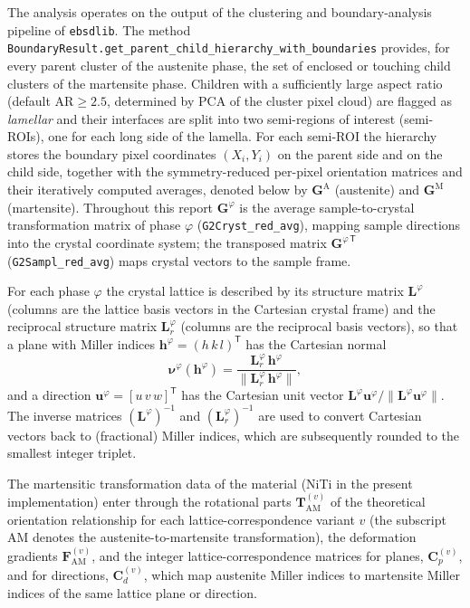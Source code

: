 \documentclass[11pt,a4paper]{article}
\newcommand{\mat}[1]{\mathbf{#1}}
\newcommand{\vc}[1]{\bm{#1}}
\begin{document}
The analysis operates on the output of the clustering and boundary-analysis pipeline of \texttt{ebsdlib}. The method \texttt{BoundaryResult.get\_parent\_child\_hierarchy\_with\_boundaries} provides, for every parent cluster of the austenite phase, the set of enclosed or touching child clusters of the martensite phase. Children with a sufficiently large aspect ratio (default $\mathrm{AR}\geq 2.5$, determined by PCA of the cluster pixel cloud) are flagged as \emph{lamellar} and their interfaces are split into two semi-regions of interest (semi-ROIs), one for each long side of the lamella. For each semi-ROI the hierarchy stores the boundary pixel coordinates $(X_i,Y_i)$ on the parent side and on the child side, together with the symmetry-reduced per-pixel orientation matrices and their iteratively computed averages, denoted below by $\mat{G}^{\mathrm{A}}$ (austenite) and $\mat{G}^{\mathrm{M}}$ (martensite). Throughout this report $\mat{G}^{\varphi}$ is the average sample-to-crystal transformation matrix of phase $\varphi$ (\texttt{G2Cryst\_red\_avg}), mapping sample directions into the crystal coordinate system; the transposed matrix $\mat{G}^{\varphi\,\mathsf{T}}$ (\texttt{G2Sampl\_red\_avg}) maps crystal vectors to the sample frame.

For each phase $\varphi$ the crystal lattice is described by its structure matrix $\mat{L}^{\varphi}$ (columns are the lattice basis vectors in the Cartesian crystal frame) and the reciprocal structure matrix $\mat{L}_{r}^{\varphi}$ (columns are the reciprocal basis vectors), so that a plane with Miller indices $\vc{h}^{\varphi}=(h\,k\,l)^{\mathsf T}$ has the Cartesian normal
\begin{equation}
\vc{\nu}^{\varphi}(\vc h^{\varphi})=\frac{\mat{L}_{r}^{\varphi}\,\vc h^{\varphi}}{\lVert \mat{L}_{r}^{\varphi}\,\vc h^{\varphi}\rVert},
\label{eq:nu}
\end{equation}
and a direction $\vc{u}^{\varphi}=[u\,v\,w]^{\mathsf T}$ has the Cartesian unit vector $\mat{L}^{\varphi}\vc u^{\varphi}/\lVert\mat{L}^{\varphi}\vc u^{\varphi}\rVert$. The inverse matrices $(\mat{L}^{\varphi})^{-1}$ and $(\mat{L}_{r}^{\varphi})^{-1}$ are used to convert Cartesian vectors back to (fractional) Miller indices, which are subsequently rounded to the smallest integer triplet.

The martensitic transformation data of the material (NiTi in the present implementation) enter through the rotational parts $\mat{T}^{(v)}_{\mathrm{AM}}$ of the theoretical orientation relationship for each lattice-correspondence variant $v$ (the subscript $\mathrm{AM}$ denotes the austenite-to-martensite transformation), the deformation gradients $\mat{F}^{(v)}_{\mathrm{AM}}$, and the integer lattice-correspondence matrices for planes, $\mat{C}_p^{(v)}$, and for directions, $\mat{C}_d^{(v)}$, which map austenite Miller indices to martensite Miller indices of the same lattice plane or direction.
\end{document}
